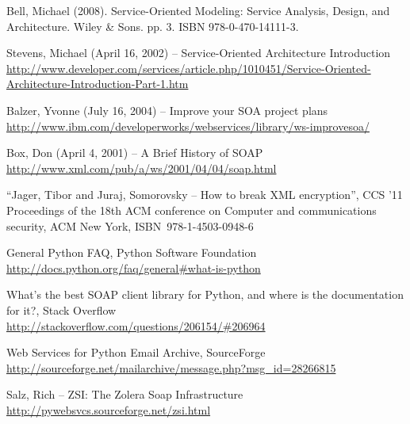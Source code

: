 

%
%

%
%


\begin{thebibliography}{99}

Bell, Michael (2008). Service-Oriented Modeling: Service Analysis, Design, and Architecture. Wiley & Sons. pp. 3. ISBN 978-0-470-14111-3.

Stevens, Michael (April 16, 2002) -- Service-Oriented Architecture Introduction
\url{http://www.developer.com/services/article.php/1010451/Service-Oriented-Architecture-Introduction-Part-1.htm}

Balzer, Yvonne (July 16, 2004) -- Improve your SOA project plans\\
\url{http://www.ibm.com/developerworks/webservices/library/ws-improvesoa/}

Box, Don (April 4, 2001) -- A Brief History of SOAP\\
\url{http://www.xml.com/pub/a/ws/2001/04/04/soap.html}

``Jager, Tibor and Juraj, Somorovsky -- How to break XML encryption'',
CCS '11 Proceedings of the 18th ACM conference on Computer and communications security,
ACM New York, \mbox{ISBN 978-1-4503-0948-6}

General Python FAQ, Python Software Foundation\\
\url{http://docs.python.org/faq/general#what-is-python}

What's the best SOAP client library for Python, and where is the documentation for it?, Stack Overflow\\
\url{http://stackoverflow.com/questions/206154/#206964}

Web Services for Python Email Archive, SourceForge\\
\url{http://sourceforge.net/mailarchive/message.php?msg_id=28266815}

Salz, Rich -- ZSI: The Zolera Soap Infrastructure\\
\url{http://pywebsvcs.sourceforge.net/zsi.html}


\end{thebibliography}
